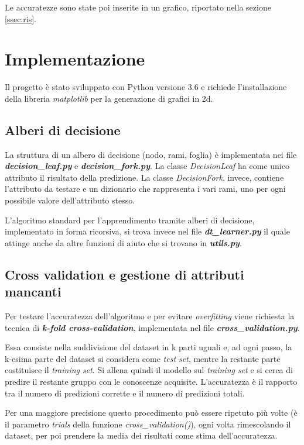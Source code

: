 \documentclass[a4paper,12pt]{article}
\begin{document}
Le accuratezze sono state poi inserite in un grafico, riportato nella sezione \ref{ssec:ris}.

\section{Implementazione}
Il progetto è stato sviluppato con Python versione 3.6 e richiede l'installazione della libreria
\textit{matplotlib} per la generazione di grafici in 2d.

\subsection{Alberi di decisione}
La struttura di un albero di decisione (nodo, rami, foglia) è implementata nei file 
\textit{\textbf{decision\_leaf.py}} e \textit{\textbf{decision\_fork.py}}. La classe \textit{DecisionLeaf} ha come unico attributo il risultato della predizione. La classe \textit{DecisionFork}, invece, contiene l'attributo da testare e un dizionario che rappresenta i vari rami, uno per ogni possibile valore dell'attributo stesso.
\newline

L'algoritmo standard per l'apprendimento tramite alberi di decisione, implementato in forma ricorsiva, si trova invece nel
file \textit{\textbf{dt\_learner.py}} il quale attinge anche da altre funzioni di aiuto che si trovano in \textit{\textbf{utils.py}}.

\subsection{Cross validation e gestione di attributi mancanti} \label{ssec:cval}
Per testare l'accuratezza dell'algoritmo e per evitare \textit{overfitting} viene richiesta la tecnica di \textit{\textbf{k-fold cross-validation}}, implementata nel file 
\textit{\textbf{cross\_validation.py}}.

 Essa consiste nella suddivisione del dataset in k parti uguali e, ad ogni passo, la k-esima parte del dataset si considera come \textit{test set}, mentre la restante parte costituisce il \textit{training set}. Si allena quindi il modello sul \textit{training set} e si cerca di predire il restante gruppo con le conoscenze acquisite. L'accuratezza è il rapporto tra il numero di predizioni corrette e il numero di predizioni totali.
 \newline

Per una maggiore precisione questo procedimento può essere ripetuto più volte (è il parametro \textit{trials} della funzione \textit{cross\_validation()}), ogni volta rimescolando il dataset, per poi prendere la media dei risultati come stima dell'accuratezza.
\newline
\end{document}
